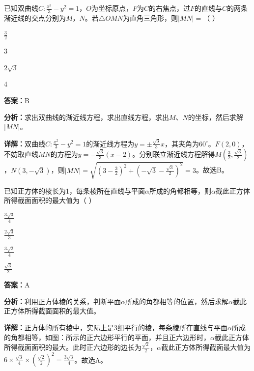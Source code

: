 \begin{question}[points=5]
已知双曲线$C:\frac{x^2}{3}-y^2=1$，$O$为坐标原点，$F$为$C$的右焦点，过$F$的直线与$C$的两条渐近线的交点分别为$M$，$N$。若$\triangle OMN$为直角三角形，则$|MN|=$（    ）
\begin{choices}
  \item $\frac{3}{2}$
  \item $3$
  \item $2\sqrt{3}$
  \item $4$
\end{choices}
\begin{solution}
\textbf{答案：}B

\textbf{分析：}求出双曲线的渐近线方程，求出直线方程，求出$M$、$N$的坐标，然后求解$|MN|$。

\textbf{详解：}双曲线$C:\frac{x^2}{3}-y^2=1$的渐近线方程为$y=\pm\frac{\sqrt{3}}{3}x$，其夹角为$60^{\circ}$。$F(2,0)$，不妨取直线$MN$的方程为$y=-\frac{\sqrt{3}}{3}(x-2)$。分别联立渐近线方程解得$M(\frac{3}{2},\frac{\sqrt{3}}{2})$，$N(3,-\sqrt{3})$，则$|MN|=\sqrt{(3-\frac{3}{2})^2+(-\sqrt{3}-\frac{\sqrt{3}}{2})^2}=3$。故选B。
\end{solution}
\end{question}

\begin{question}[points=5]
已知正方体的棱长为1，每条棱所在直线与平面$\alpha$所成的角都相等，则$\alpha$截此正方体所得截面面积的最大值为（    ）
\begin{choices}
  \item $\frac{3\sqrt{3}}{4}$
  \item $\frac{2\sqrt{3}}{3}$
  \item $\frac{3\sqrt{2}}{4}$
  \item $\frac{\sqrt{3}}{2}$
\end{choices}
\begin{solution}
\textbf{答案：}A

\textbf{分析：}利用正方体棱的关系，判断平面$\alpha$所成的角都相等的位置，然后求解$\alpha$截此正方体所得截面面积的最大值。

\textbf{详解：}正方体的所有棱中，实际上是3组平行的棱，每条棱所在直线与平面$\alpha$所成的角都相等，如图：所示的正六边形平行的平面，并且正六边形时，$\alpha$截此正方体所得截面面积的最大。此时正六边形的边长为$\frac{\sqrt{2}}{2}$，$\alpha$截此正方体所得截面最大值为$6\times\frac{\sqrt{3}}{4}\times(\frac{\sqrt{2}}{2})^2=\frac{3\sqrt{3}}{4}$。故选A。
\end{solution}
\end{question}

